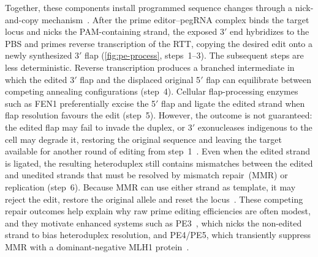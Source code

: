 \documentclass{article}
\begin{document}
Together, these components install programmed sequence changes through a nick-and-copy mechanism~\cite{anzaloneSearchandreplaceGenomeEditing2019}.
After the prime editor--pegRNA complex binds the target locus and nicks the PAM-containing strand, the exposed 3$'$ end hybridizes to the PBS and primes reverse transcription of the RTT, copying the desired edit onto a newly synthesized 3$'$ flap (\autoref{fig:pe-process}, steps~1--3).
The subsequent steps are less deterministic.
Reverse transcription produces a branched intermediate in which the edited 3$'$ flap and the displaced original 5$'$ flap can equilibrate between competing annealing configurations (step~4).
Cellular flap-processing enzymes such as FEN1 preferentially excise the 5$'$ flap and ligate the edited strand when flap resolution favours the edit (step~5).
However, the outcome is not guaranteed: the edited flap may fail to invade the duplex, or 3$'$ exonucleases indigenous to the cell may degrade it, restoring the original sequence and leaving the target available for another round of editing from step~1~\cite{anzaloneSearchandreplaceGenomeEditing2019}.
Even when the edited strand is ligated, the resulting heteroduplex still contains mismatches between the edited and unedited strands that must be resolved by mismatch repair~(MMR) or replication (step~6).
Because MMR can use either strand as template, it may reject the edit, restore the original allele and reset the locus~\cite{anzaloneSearchandreplaceGenomeEditing2019,chenEnhancedPrimeEditing2021}.
These competing repair outcomes help explain why raw prime editing efficiencies are often modest, and they motivate enhanced systems such as PE3~\cite{anzaloneSearchandreplaceGenomeEditing2019}, which nicks the non-edited strand to bias heteroduplex resolution, and PE4/PE5, which transiently suppress MMR with a dominant-negative MLH1 protein~\cite{chenEnhancedPrimeEditing2021}.
\end{document}
